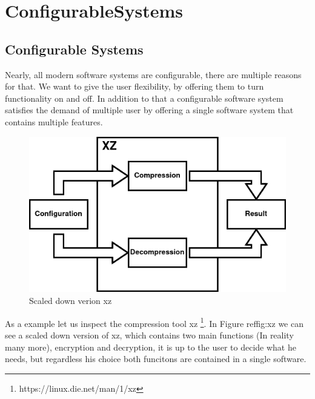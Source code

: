 \chapter{ConfigurableSystems}\label{ch:configurableSystems}

\section{Configurable Systems}

Nearly, all modern software systems are configurable, there are multiple reasons for that. 
We want to give the user flexibility, by offering them to turn functionality on and off. 
In addition to that a configurable software system satisfies the demand of multiple user by offering a single software system that contains multiple features. 
\cite{TooManyKnobs}

\begin{figure}[h]
    \centering
    \includegraphics[scale=0.6]{gfx/ConfigurableSystemXZ.png}
    \caption{Scaled down verion xz}
    \label{fig:xz}
\end{figure}

As a example let us inspect the compression tool xz  \footnote{https://linux.die.net/man/1/xz}. In Figure ref{fig:xz}
we can see a scaled down version of xz, which contains two main functions (In reality many more), encryption and decryption, it is up to the user to 
decide what he needs, but regardless his choice both funcitons are contained in a single software.
